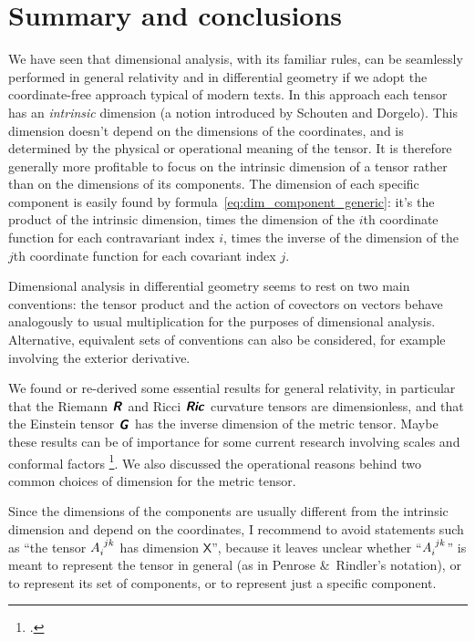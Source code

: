\documentclass[\ifafour a4paper,12pt,\else a5paper,10pt,\fi%
onecolumn,oneside,article,%
british%
]{memoir}
\makeatletter
\theoremstyle{remark}
\theoremstyle{innote}
\newcommand*{\mathte}[1]{\textbf{\textit{\textsf{#1}}}}
\newcommand*{\citep}{\footcites}
\newcommand*{\amp}{\&}
\newcommand*{\defd}{\coloneqq}
\renewcommand*{\|}[1][]{\nonscript\,#1\vert\nonscript\;\mathopen{}}
\newcommand*{\eg}{{e.g.}}
\newcommand*{\q}{}%
\DeclareRobustCommand*{\q}{%
  \mathbin{\mathpalette\bigcdot@{}}%
}
\newcommand*{\bigcdot@scalefactor}{0.75}
\newcommand*{\bigcdot@widthfactor}{1.5}
\newcommand*{\bigcdot@}[2]{%
  \sbox0{$#1\vcenter{}$}%
  \sbox2{$#1\cdot\m@th$}%
  \hbox to \bigcdot@widthfactor\wd2{%
    \hfil
    \raise\ht0\hbox{%
      \scalebox{\bigcdot@scalefactor}{%
        \lower\ht0\hbox{$#1\bullet\m@th$}%
      }%
    }%
    \hfil
  }%
}
\newcommand*{\Un}{\textsf{1}}
\newcommand*{\Xx}{\textsf{X}}
\newcommand*{\yg}{\mathte{g}}
\newcommand*{\yG}{\mathte{G}}
\newcommand*{\yR}{\mathte{R}}
\newcommand*{\yRi}{\mathte{Ric}}
\renewcommand*{\i}{\indices}
\makeatother
\begin{document}



\section{Summary and conclusions}
\label{sec:summary}

We have seen that dimensional analysis, with its familiar rules, can be
seamlessly performed in general relativity and in differential geometry if
we adopt the coordinate-free approach typical of modern texts. In this
approach each tensor has an \emph{intrinsic} dimension (a notion introduced
by Schouten and Dorgelo). This dimension doesn't depend on the
dimensions of the coordinates, and is determined by the physical or
operational meaning of the tensor. It is therefore generally more
profitable to focus on the intrinsic dimension of a tensor rather than on
the dimensions of its components. The dimension of each specific component is
easily found by formula~\eqref{eq:dim_component_generic}: it's the product
of the intrinsic dimension, times the dimension of the $i$th coordinate
function for each contravariant index $i$, times the inverse of the
dimension of the $j$th coordinate function for each covariant index $j$.

Dimensional analysis in differential geometry seems to rest on two main
conventions: the tensor product and the action of covectors on vectors
behave analogously to usual multiplication for the purposes of dimensional
analysis. Alternative, equivalent sets of conventions can also be
considered, for example involving the exterior derivative.

We found or re-derived some essential results for general relativity, in
particular that the Riemann $\yR\i{^{\q}_{\q\q\q}}$ and Ricci
$\yRi\i{_{\q\q}}$ curvature tensors are dimensionless, and that the
Einstein tensor $\yG\i{_{\q}^{\q}}$ has the inverse dimension of the metric
tensor. Maybe these results can be of importance for some current research
involving scales and conformal factors
\citep[\eg][]{roehretal2005,cadonietal2019}. We also discussed the
operational reasons behind two common choices of dimension for the metric
tensor.

Since the dimensions of the components are usually different from the
intrinsic dimension and depend on the coordinates, I recommend to avoid
statements such as \enquote{the tensor $A\i{_{i}^{jk}}$ has dimension
  $\Xx$}, because it leaves unclear whether \enquote{$A\i{_{i}^{jk}}$} is
meant to represent the tensor in general (as in Penrose \amp\ Rindler's
notation), or to represent its set of components, or to represent just a
specific component.
\end{document}
